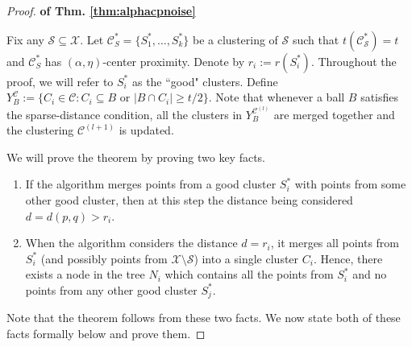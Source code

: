 \documentclass[anon,12pt]{colt2016} %
\newcommand{\mc}{\mathcal}
\begin{document}
\begin{proof}\textbf{ of Thm. \ref{thm:alphacpnoise}}

Fix any $\mc S \subseteq \mc X$. Let $\mc C^*_S = \{S_1^*, \ldots, S_k^*\}$ be a clustering of $\mc S$ such that $t(\mc C_{\mc S}^*) = t$ and $\mc C^*_S$ has $(\alpha, \eta)$-center proximity. Denote by $r_i := r(S_i^*)$. Throughout the proof, we will refer to $S_i^*$ as the ``good" clusters. Define $Y_B^{\mc C} := \{C_i \in \mc C : C_i \subseteq B \text{ or } |B \cap C_i| \ge t/2\}$. Note that whenever a ball $B$ satisfies the sparse-distance condition, all the clusters in $Y_{B}^{{\mc C}^{(l)}}$ are merged together and the clustering $\mc C^{(l+1)}$ is updated.

\noindent We will prove the theorem by proving two key facts.

\begin{enumerate}[nolistsep, noitemsep, label=\textbf{F.\arabic*}]
\renewcommand\labelitemi{$\diamond$}
\item \label{fact:1} If the algorithm merges points from a good cluster $S_i^*$ with points from some other good cluster,  then at this step the distance being considered $d = d(p,q) > r_i$.	
\item \label{fact:2} When the algorithm considers the distance $d = r_i$, it merges all points from $S_i^*$ (and possibly points from $\mc X\setminus \mc S$) into a single cluster $C_i$. Hence, there exists a node in the tree $N_i$ which contains all the points from $S_i^*$ and no points from any other good cluster $S_j^*$. 	
\end{enumerate}
Note that the theorem follows from these two facts. We now state both of these facts formally below and prove them.


\end{proof}
\end{document}
